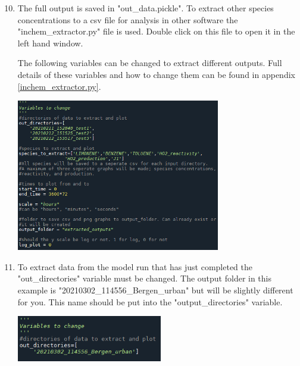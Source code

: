 \documentclass[a4paper]{refart}
\begin{document}
\newpage
{\hspace*{-\leftmarginwidth}
\begin{minipage}{\fullwidth}
\linespread{2.0}\selectfont
\begin{enumerate}
\setcounter{enumi}{9}
    \item The full output is saved in "out\_data.pickle". To extract other species concentrations to a csv file for analysis in other software the "inchem\_extractor.py" file is used. Double click on this file to open it in the left hand window. 
    
    The following variables can be changed to extract different outputs. Full details of these variables and how to change them can be found in appendix \ref{inchem_extractor.py}.
                        
            \vspace{1em}
            \begin{minipage}[t]{\linewidth}
                \centering
                \includegraphics[width = 0.7\textwidth]{extractor.png}
            \end{minipage}

    \item To extract data from the model run that has just completed the "out\_directories" variable must be changed. The output folder in this example is "20210302\_114556\_Bergen\_urban" but will be slightly different for you. This name should be put into the "output\_directories" variable. 
                        
            \vspace{1em}
            \begin{minipage}[t]{\linewidth}
                \centering
                \includegraphics[width = 0.5\textwidth]{out_directories_variable.png}
            \end{minipage}
    

\end{enumerate}
\end{minipage}}
\end{document}
